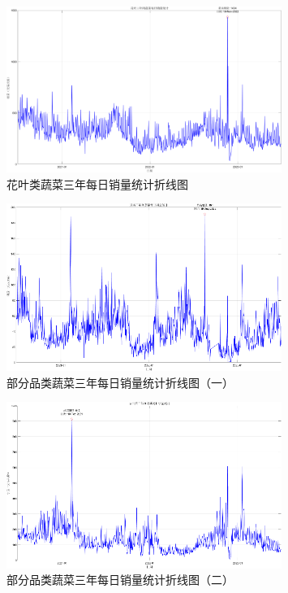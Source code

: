 \documentclass{cumcmthesis}
\begin{document}
\begin{figure}[H]
    \centering
    \includegraphics[width=0.8\textwidth]{花叶三年间蔬菜每日销量统计.png} 
    \caption{花叶类蔬菜三年每日销量统计折线图}
\end{figure}

\begin{figure}[H]
    \centering
    \includegraphics[width=0.8\textwidth]{其他品类日销量折线图1.png} 
    \caption{部分品类蔬菜三年每日销量统计折线图（一）}
\end{figure}

\begin{figure}[H]
    \centering
    \includegraphics[width=0.8\textwidth]{其他品类日销量折线图2.png} 
    \caption{部分品类蔬菜三年每日销量统计折线图（二）}
\end{figure}
\end{document}
